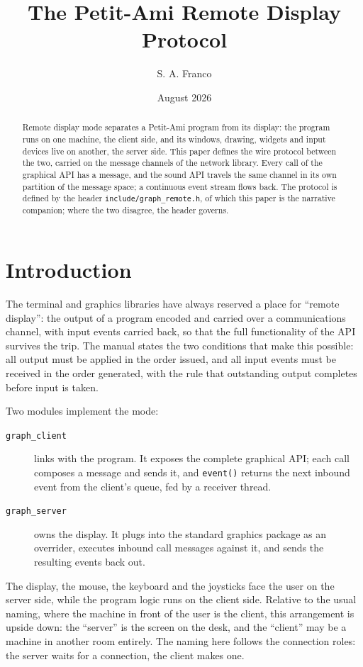 \documentclass[11pt]{article}
\title{The Petit-Ami Remote Display Protocol}
\author{S. A. Franco}
\date{August 2026}
\begin{document}
\maketitle

\begin{abstract}
Remote display mode separates a Petit-Ami program from its display: the
program runs on one machine, the client side, and its windows, drawing,
widgets and input devices live on another, the server side. This paper
defines the wire protocol between the two, carried on the message channels
of the network library. Every call of the graphical API has a message, and
the sound API travels the same channel in its own partition of the message
space; a continuous event stream flows back. The protocol is defined by the header
\texttt{include/graph\_remote.h}, of which this paper is the narrative
companion; where the two disagree, the header governs.
\end{abstract}

\tableofcontents

\section{Introduction}

The terminal and graphics libraries have always reserved a place for
``remote display'': the output of a program encoded and carried over a
communications channel, with input events carried back, so that the full
functionality of the API survives the trip. The manual states the two
conditions that make this possible: all output must be applied in the order
issued, and all input events must be received in the order generated, with
the rule that outstanding output completes before input is taken.

Two modules implement the mode:

\begin{description}
\item[\texttt{graph\_client}] links with the program. It exposes the
complete graphical API; each call composes a message and sends it, and
\texttt{event()} returns the next inbound event from the client's queue,
fed by a receiver thread.
\item[\texttt{graph\_server}] owns the display. It plugs into the standard
graphics package as an overrider, executes inbound call messages against
it, and sends the resulting events back out.
\end{description}

The display, the mouse, the keyboard and the joysticks face the user on the
server side, while the program logic runs on the client side. Relative to
the usual naming, where the machine in front of the user is the client,
this arrangement is upside down: the ``server'' is the screen on the desk,
and the ``client'' may be a machine in another room entirely. The naming
here follows the connection roles: the server waits for a connection, the
client makes one.
\end{document}
